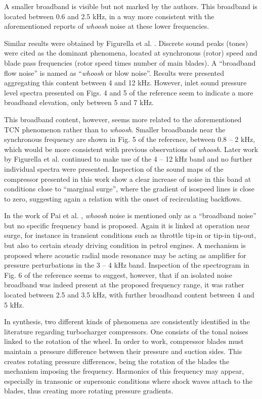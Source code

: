A smaller broadband is visible but not marked by the authors. This broadband is located between 0.6 and 2.5 kHz, in a way more consistent with the aforementioned reports of \emph{whoosh} noise at these lower frequencies.

Similar results were obtained by Figurella et al. \cite{figurella2014noise}. Discrete sound peaks (tones) were cited as the dominant phenomena, located at synchronous (rotor) speed and blade pass frequencies (rotor speed times number of main blades). A ``broadband flow noise'' is named as ``\emph{whoosh} or blow noise''. Results were presented aggregating this content between 4 and 12 kHz. However, inlet sound pressure level spectra presented on Figs. 4 and 5 of the reference seem to indicate a more broadband elevation, only between 5 and 7 kHz. 

This broadband content, however, seems more related to the aforementioned TCN phenomenon rather than to \emph{whoosh}. Smaller broadbands near the synchronous frequency are shown in Fig. 5 of the reference, between 0.8 -- 2 kHz, which would be more consistent with previous observations of \emph{whoosh}. Later work by Figurella et al. \cite{figurella2014effect} continued to make use of the 4 -- 12 kHz band and no further individual spectra were presented. Inspection of the sound maps of the compressor presented in this work show a clear increase of noise in this band at conditions close to ``marginal surge'', where the gradient of isospeed lines is close to zero, suggesting again a relation with the onset of recirculating backflows.

In the work of Pai et al. \cite{pai2015turbocharger}, \emph{whoosh} noise is mentioned only as a ``broadband noise'' but no specific frequency band is proposed. Again it is linked at operation near surge, for instance in transient conditions such as throttle tip-in or tip-in tip-out, but also to certain steady driving condition in petrol engines. A mechanism is proposed where acoustic radial mode resonance may be acting as amplifier for pressure perturbations in the 3 -- 4 kHz band. Inspection of the spectrogram in Fig. 6 of the reference seems to suggest, however, that if an isolated noise broadband was indeed present at the proposed frequency range, it was rather located between 2.5 and 3.5 kHz, with further broadband content between 4 and 5 kHz.

In synthesis, two different kinds of phenomena are consistently identified in the literature regarding turbocharger compressors. One consists of the tonal noises linked to the rotation of the wheel. In order to work, compressor blades must maintain a pressure difference between their pressure and suction sides. This creates rotating pressure differences, being the rotation of the blades the mechanism imposing the frequency. Harmonics of this frequency may appear, especially in transonic or supersonic conditions where shock waves attach to the blades, thus creating more rotating pressure gradients.

